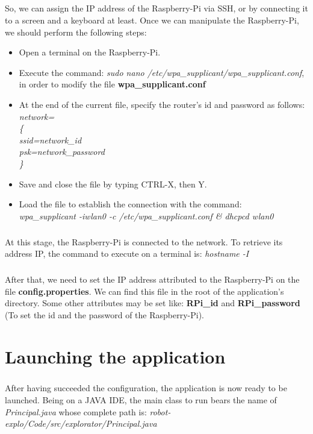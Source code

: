 \documentclass[12pt]{report}
\begin{document}
\paragraph{}
So, we can assign the IP address of the Raspberry-Pi via SSH, or by connecting it to a screen and a keyboard at least. Once we can manipulate the Raspberry-Pi, we should perform the following steps:
\begin{itemize}
    \item Open a terminal on the Raspberry-Pi.
    \item Execute the command: \emph{sudo nano /etc/wpa\_supplicant/wpa\_supplicant.conf}, in order to modify the file \textbf{wpa\_supplicant.conf}
    \item At the end of the current file, specify the router's id and password as follows: 
    \\\emph{
    network=\\ \{\\
    ssid=network\_id \\
    psk=network\_password \\
    \}}
    \item Save and close the file by typing CTRL-X, then Y.
    \item Load the file to establish the connection with the command: \\ \emph{wpa\_supplicant -iwlan0 -c /etc/wpa\_supplicant.conf \& dhcpcd wlan0}
\end{itemize}
\paragraph{}
At this stage, the Raspberry-Pi is connected to the network. To retrieve its address IP, the command to execute on a terminal is: \emph{hostname -I}
\paragraph{}
After that, we need to set the IP address attributed to the Raspberry-Pi on the file \textbf{config.properties}. We can find this file in the root of the application's directory. Some other attributes may be set like: \textbf{RPi\_id} and \textbf{RPi\_password} (To set the id and the password of the Raspberry-Pi).

\chapter{Launching the application}
\paragraph{}
After having succeeded the configuration, the application is now ready to be launched. Being on a JAVA IDE, the main class to run bears the name of \emph{Principal.java} whose complete path is: \emph{robot-explo/Code/src/explorator/Principal.java} 
\end{document}
